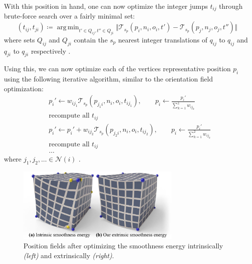 \documentclass{ACGSeminar}
\DeclareMathOperator*{\argmin}{arg\,min}
\begin{document}
With this position in hand, one can now optimize the integer jumps $t_{ij}$ through brute-force search over a fairly minimal set:
\begin{equation*}
	(t_{ij}, t_{ji}) \coloneqq \argmin_{t' \in Q_{ij}, t'' \in Q_{ji}} \Vert \mathcal{T}_{s_p}(p_i, n_i, o_i, t') - \mathcal{T}_{s_p}(p_j, n_j, o_j, t'') \Vert
\end{equation*}
where sets $Q_{ij}$ and $Q_{ji}$ contain the $s_p$ nearest integer translations of $q_{ij}$ to $q_{ij}$ and $q_{ji}$ to $q_{ji}$ respectively \cite{jakob2015instant}.\bigskip

Using this, we can now optimize each of the vertices representative position $p_i$ using the following iterative algorithm, similar to the orientation field optimization:
\begin{equation*}
\begin{split}
	& p_i' \leftarrow w_{ij_1} \mathcal{T}_{s_p}(p_{j_1i}, n_i, o_i, t_{ij_1}), \qquad p_i \leftarrow \frac{p_i'}{\sum_{k=1}^1 w_{ij_k}} \\
	& \textrm{recompute all } t_{ij}\\
	& p_i' \leftarrow p_i' + w_{ij_2} \mathcal{T}_{s_p}(p_{j_2i}, n_i, o_i, t_{ij_2}), \qquad p_i \leftarrow \frac{p_i'}{\sum_{k=1}^2 w_{ij_k}} \\
	& \textrm{recompute all } t_{ij}\\
	& \dots
\end{split}
\end{equation*}
where $j_1, j_2, \dots \in \mathcal{N}(i)$ \cite{jakob2015instant}.

\begin{figure}[htb!]
	\begin{centering}
		\includegraphics[width=8cm]{img/position-field-illustration.png}\par
	\end{centering}
	\caption{Position fields after optimizing the smoothness energy intrinsically \textit{(left)} and extrinsically \textit{(right)}. \cite{jakob2015instant}}
	\label{fig:position-field-illustration}
\end{figure}
\end{document}
